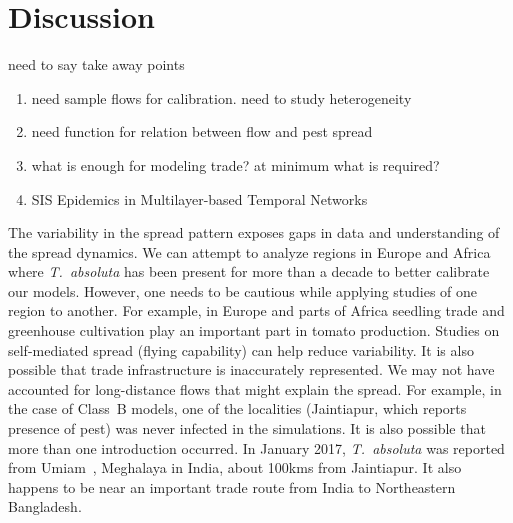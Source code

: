\documentclass[11pt]{article}
\newcommand{\tuta}{\emph{T.~absoluta}}
\theoremstyle{definition}
\begin{document}
\section{Discussion}
need to say take away points
\begin{enumerate}
    \item need sample flows for calibration. need to study heterogeneity
    \item need function for relation between flow and pest spread
    \item what is enough for modeling trade? at minimum what is
    required?
    \item SIS Epidemics in Multilayer-based Temporal Networks
\end{enumerate}

The variability in the spread pattern exposes gaps in data and
understanding of the spread dynamics. We can attempt to analyze regions in
Europe and Africa where \tuta{} has been present for more than a decade to
better calibrate our models. However, one needs to be cautious while
applying studies of one region to another. For example, in Europe and parts
of Africa seedling trade and greenhouse cultivation play an important part
in tomato production. Studies on self-mediated spread (flying capability)
can help reduce variability. It is also possible that trade infrastructure
is inaccurately represented. We may not have accounted for long-distance
flows that might explain the spread. For example, in the case of Class~B
models, one of the localities (Jaintiapur, which reports presence of pest)
was never infected in the simulations. It is also possible that more than
one introduction occurred.  In January 2017, \tuta{} was reported from
Umiam~\cite{sankarganesh2017}, Meghalaya in India, about 100kms from
Jaintiapur. It also happens to be near an important trade route from India
to Northeastern Bangladesh.
\end{document}
